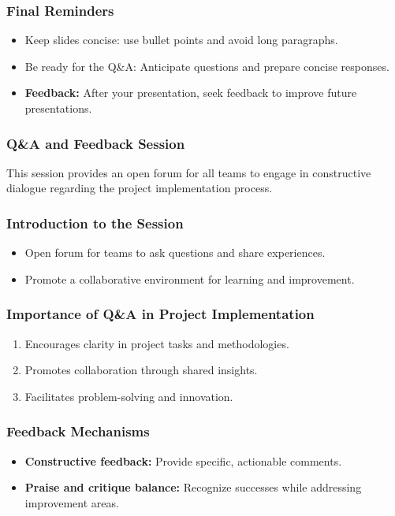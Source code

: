 \documentclass{beamer}
\begin{document}
\begin{frame}[fragile]
    \frametitle{Final Reminders}
    \begin{itemize}
        \item Keep slides concise: use bullet points and avoid long paragraphs.
        \item Be ready for the Q\&A: Anticipate questions and prepare concise responses.
        \item \textbf{Feedback:} After your presentation, seek feedback to improve future presentations.
    \end{itemize}
\end{frame}

\begin{frame}[fragile]
    \frametitle{Q\&A and Feedback Session}
    This session provides an open forum for all teams to engage in constructive dialogue regarding the project implementation process.
\end{frame}

\begin{frame}[fragile]
    \frametitle{Introduction to the Session}
    \begin{itemize}
        \item Open forum for teams to ask questions and share experiences.
        \item Promote a collaborative environment for learning and improvement.
    \end{itemize}
\end{frame}

\begin{frame}[fragile]
    \frametitle{Importance of Q\&A in Project Implementation}
    \begin{enumerate}
        \item Encourages clarity in project tasks and methodologies.
        \item Promotes collaboration through shared insights.
        \item Facilitates problem-solving and innovation.
    \end{enumerate}
\end{frame}

\begin{frame}[fragile]
    \frametitle{Feedback Mechanisms}
    \begin{itemize}
        \item \textbf{Constructive feedback:} Provide specific, actionable comments.
        \item \textbf{Praise and critique balance:} Recognize successes while addressing improvement areas.
    \end{itemize}
\end{frame}
\end{document}
